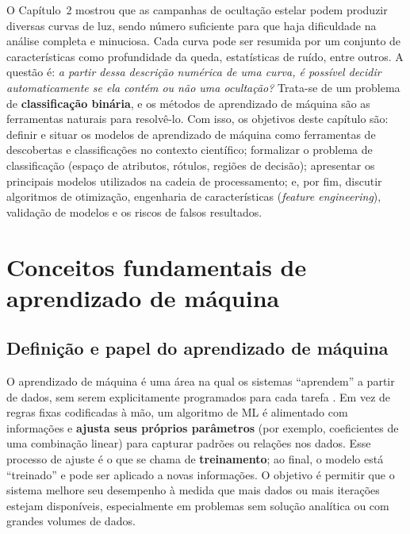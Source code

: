 
 O Capítulo~2 mostrou que as campanhas de ocultação estelar podem produzir diversas curvas de luz, sendo número suficiente para que haja dificuldade na análise completa e minuciosa. Cada curva pode ser resumida por um conjunto de características como profundidade da queda, estatísticas de ruído, entre outros. A questão é: \emph{a partir dessa descrição numérica de uma curva, é possível decidir automaticamente se ela contém ou não uma ocultação?} Trata-se de um problema de \textbf{classificação binária}, e os métodos de aprendizado de máquina são as ferramentas naturais para resolvê-lo. Com isso, os objetivos deste capítulo são: definir e situar os modelos de aprendizado de máquina como ferramentas de descobertas e classificações no contexto científico; formalizar o problema de classificação (espaço de atributos, rótulos, regiões de decisão); apresentar os principais modelos utilizados na cadeia de processamento; e, por fim, discutir algoritmos de otimização, engenharia de características (\textit{feature engineering}), validação de modelos e os riscos de falsos resultados.

\section{Conceitos fundamentais de aprendizado de máquina}
\label{sec:fundamentos_ml}

\subsection{Definição e papel do aprendizado de máquina}

O aprendizado de máquina é uma área na qual os sistemas ``aprendem'' a partir de dados, sem serem explicitamente programados para cada tarefa \citep{geron2019maos}. Em vez de regras fixas codificadas à mão, um algoritmo de ML é alimentado com informações e \textbf{ajusta seus próprios parâmetros} (por exemplo, coeficientes de uma combinação linear) para capturar padrões ou relações nos dados. Esse processo de ajuste é o que se chama de \textbf{treinamento}; ao final, o modelo está ``treinado'' e pode ser aplicado a novas informações. O objetivo é permitir que o sistema melhore seu desempenho à medida que mais dados ou mais iterações estejam disponíveis, especialmente em problemas sem solução analítica ou com grandes volumes de dados.

